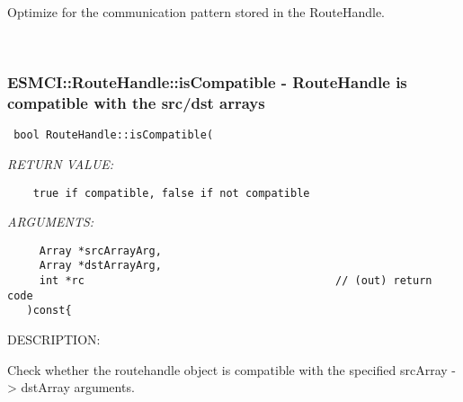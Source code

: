     Optimize for the communication pattern stored in the RouteHandle.
   
 
\mbox{}\hrulefill\ 
 
\subsubsection [ESMCI::RouteHandle::isCompatible] {ESMCI::RouteHandle::isCompatible - RouteHandle is compatible with the src/dst arrays}


  
\begin{verbatim} bool RouteHandle::isCompatible(\end{verbatim}{\em RETURN VALUE:}
\begin{verbatim}    true if compatible, false if not compatible\end{verbatim}{\em ARGUMENTS:}
\begin{verbatim}     Array *srcArrayArg,
     Array *dstArrayArg,
     int *rc                                       // (out) return code
   )const{\end{verbatim}
{\sf DESCRIPTION:\\ }


    Check whether the routehandle object is compatible with the specified
    srcArray -> dstArray arguments.
  
\setlength{\parskip}{\oldparskip}
\setlength{\parindent}{\oldparindent}
\setlength{\baselineskip}{\oldbaselineskip}
